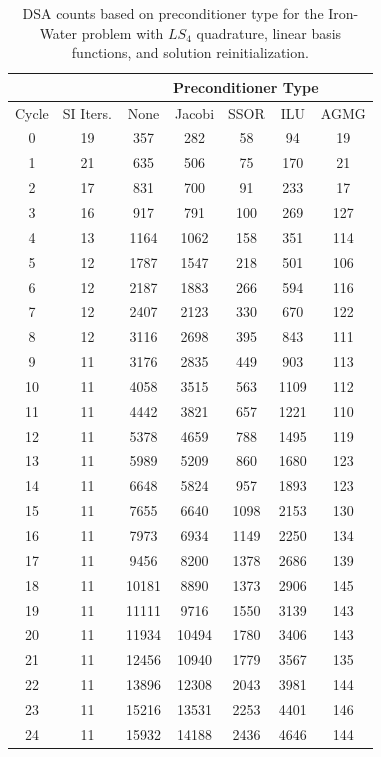 \begin{table}
\caption{DSA counts based on preconditioner type for the Iron-Water problem with $LS_4$ quadrature, linear basis functions, and solution reinitialization.}
\begin{center}
\def\arraystretch{1.25}
\begin{tabular}{|c|c|c|c|c|c|c|}
\hline
& & \multicolumn{5}{c}{Preconditioner Type}\vline\\
\hline
Cycle & SI Iters. & None&Jacobi&SSOR& ILU& AGMG \\
\hline
0&19&357&282&58&94&19\\
1&21&635&506&75&170&21\\
2&17&831&700&91&233&17\\
3&16&917&791&100&269&127\\
4&13&1164&1062&158&351&114\\
5&12&1787&1547&218&501&106\\
6&12&2187&1883&266&594&116\\
7&12&2407&2123&330&670&122\\
8&12&3116&2698&395&843&111\\
9&11&3176&2835&449&903&113\\
10&11&4058&3515&563&1109&112\\
11&11&4442&3821&657&1221&110\\
12&11&5378&4659&788&1495&119\\
13&11&5989&5209&860&1680&123\\
14&11&6648&5824&957&1893&123\\
15&11&7655&6640&1098&2153&130\\
16&11&7973&6934&1149&2250&134\\
17&11&9456&8200&1378&2686&139\\
18&11&10181&8890&1373&2906&145\\
19&11&11111&9716&1550&3139&143\\
20&11&11934&10494&1780&3406&143\\
21&11&12456&10940&1779&3567&135\\
22&11&13896&12308&2043&3981&144\\
23&11&15216&13531&2253&4401&146\\
24&11&15932&14188&2436&4646&144\\
\hline
\end{tabular}
\end{center}
\label{tab::DSA_IW_LS4_k1_reinit}
\end{table}

